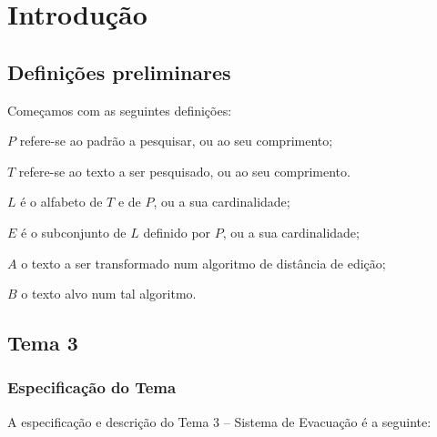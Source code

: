 \documentclass[relatorio.tex]{subfiles}
\begin{document}
\section{Introdução}
\label{sec:intro}

\subsection{Definições preliminares}
\label{subsec:preliminaries}

Começamos com as seguintes definições:

\begin{definitions}
\item $P$ refere-se ao padrão a pesquisar, ou ao seu comprimento;

\item $T$ refere-se ao texto a ser pesquisado, ou ao seu comprimento.

\item $L$ é o alfabeto de $T$ e de $P$, ou a sua cardinalidade;

\item $E$ é o subconjunto de $L$ definido por $P$, ou a sua cardinalidade;

\item $A$ o texto a ser transformado num algoritmo de distância de edição;

\item $B$ o texto alvo num tal algoritmo.
\end{definitions}



\subsection{Tema 3}
\label{subsec:tema}

\subsubsection{Especificação do Tema}
\label{subsubsec:spec}

A especificação e descrição do Tema 3 -- Sistema de Evacuação
é a seguinte:
\end{document}
